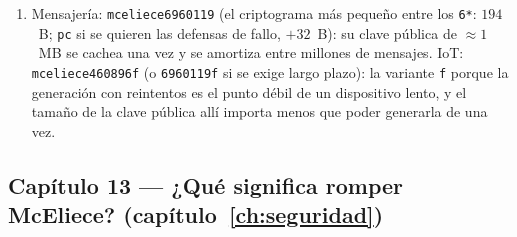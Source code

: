 \begin{enumerate}[leftmargin=1.9em,itemsep=4pt]
        $\Ftwo^{1547}$. En modo Simply el relleno se ignora: ambas
        producen la \emph{misma} $K$ (un solo valor distinto). En
        modo Narrowly, la cadena con relleno no nulo se rechaza:
        una produce la $K$ legítima y la otra la clave de la rama de
        rechazo. Debe fijarlo el protocolo porque una implementación
        Simply y una Narrowly, mezcladas, discreparían en qué clave
        corresponde a los mismos bytes: es la maleabilidad benigna
        de la figura~\ref{fig:param-narrowly}.
  \item Mensajería: \texttt{mceliece6960119} (el criptograma más
        pequeño entre los \texttt{6*}: $194$~B; \texttt{pc} si se
        quieren las defensas de fallo, $+32$~B): su clave pública de
        $\approx1$~MB se cachea una vez y se amortiza entre millones
        de mensajes. IoT: \texttt{mceliece460896f} (o
        \texttt{6960119f} si se exige largo plazo): la variante
        \texttt{f} porque la generación con reintentos es el punto
        débil de un dispositivo lento, y el tamaño de la clave
        pública allí importa menos que poder generarla de una vez.
\end{enumerate}

\subsection*{Capítulo 13 --- ¿Qué significa romper McEliece?
(capítulo~\ref{ch:seguridad})}

